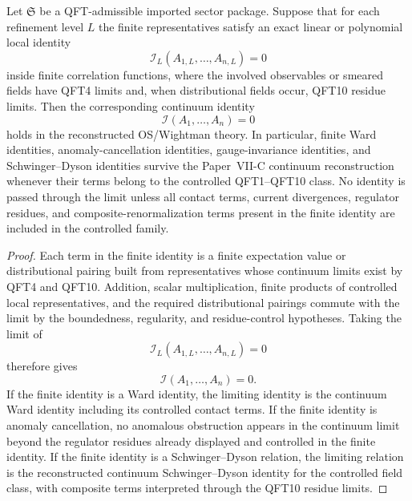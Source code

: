 \documentclass[12pt,a4paper]{article}
\begin{document}
\begin{theorem}
\label{p12:thm:finite-identity-preservation}
Let \(\mathfrak S\) be a QFT-admissible imported sector package.  Suppose that for each refinement level \(L\) the finite representatives satisfy an exact linear or polynomial local identity
\[
\mathcal I_L(A_{1,L},\ldots,A_{n,L})=0
\]
inside finite correlation functions, where the involved observables or smeared fields have QFT4 limits and, when distributional fields occur, QFT10 residue limits.  Then the corresponding continuum identity
\[
\mathcal I(A_1,\ldots,A_n)=0
\]
holds in the reconstructed OS/Wightman theory.  In particular, finite Ward identities, anomaly-cancellation identities, gauge-invariance identities, and Schwinger--Dyson identities survive the Paper~VII-C continuum reconstruction whenever their terms belong to the controlled QFT1--QFT10 class.  No identity is passed through the limit unless all contact terms, current divergences, regulator residues, and composite-renormalization terms present in the finite identity are included in the controlled family.
\end{theorem}

\begin{proof}
Each term in the finite identity is a finite expectation value or distributional pairing built from representatives whose continuum limits exist by QFT4 and QFT10.  Addition, scalar multiplication, finite products of controlled local representatives, and the required distributional pairings commute with the limit by the boundedness, regularity, and residue-control hypotheses.  Taking the limit of
\[
\mathcal I_L(A_{1,L},\ldots,A_{n,L})=0
\]
therefore gives
\[
\mathcal I(A_1,\ldots,A_n)=0.
\]
If the finite identity is a Ward identity, the limiting identity is the continuum Ward identity including its controlled contact terms.  If the finite identity is anomaly cancellation, no anomalous obstruction appears in the continuum limit beyond the regulator residues already displayed and controlled in the finite identity.  If the finite identity is a Schwinger--Dyson relation, the limiting relation is the reconstructed continuum Schwinger--Dyson identity for the controlled field class, with composite terms interpreted through the QFT10 residue limits.
\end{proof}
\end{document}
